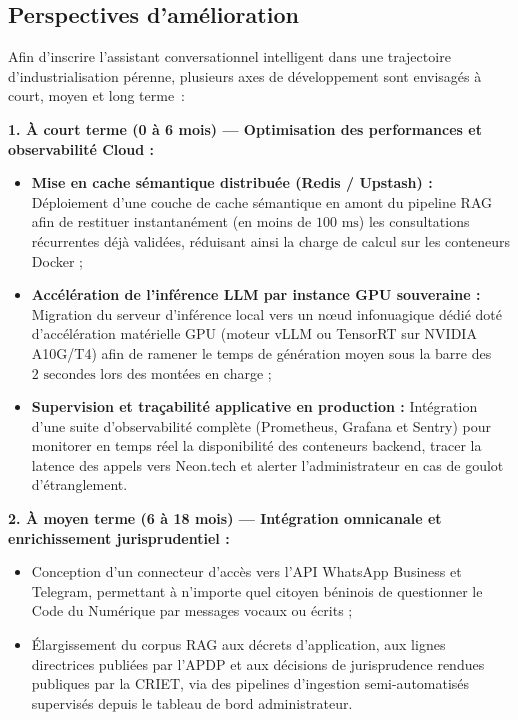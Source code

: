 \subsection{Perspectives d'amélioration}

Afin d'inscrire l'assistant conversationnel intelligent dans une trajectoire d'industrialisation pérenne, plusieurs axes de développement sont envisagés à court, moyen et long terme~:

\medskip

\noindent\textbf{1. À court terme (0 à 6 mois) — Optimisation des performances et observabilité Cloud :}
\begin{itemize}
    \item \textbf{Mise en cache sémantique distribuée (Redis / Upstash) :} Déploiement d'une couche de cache sémantique en amont du pipeline RAG afin de restituer instantanément (en moins de $100\text{ ms}$) les consultations récurrentes déjà validées, réduisant ainsi la charge de calcul sur les conteneurs Docker ;
    
    \item \textbf{Accélération de l'inférence LLM par instance GPU souveraine :} Migration du serveur d'inférence local vers un nœud infonuagique dédié doté d'accélération matérielle GPU (moteur vLLM ou TensorRT sur NVIDIA A10G/T4) afin de ramener le temps de génération moyen sous la barre des $2\text{ secondes}$ lors des montées en charge ;
    
    \item \textbf{Supervision et traçabilité applicative en production :} Intégration d'une suite d'observabilité complète (Prometheus, Grafana et Sentry) pour monitorer en temps réel la disponibilité des conteneurs backend, tracer la latence des appels vers Neon.tech et alerter l'administrateur en cas de goulot d'étranglement.
\end{itemize}

\medskip

\noindent\textbf{2. À moyen terme (6 à 18 mois) — Intégration omnicanale et enrichissement jurisprudentiel :}
\begin{itemize}
    \item Conception d'un connecteur d'accès vers l'API WhatsApp Business et Telegram, permettant à n'importe quel citoyen béninois de questionner le Code du Numérique par messages vocaux ou écrits ;
    \item Élargissement du corpus RAG aux décrets d'application, aux lignes directrices publiées par l'APDP et aux décisions de jurisprudence rendues publiques par la CRIET, via des pipelines d'ingestion semi-automatisés supervisés depuis le tableau de bord administrateur.
\end{itemize}


